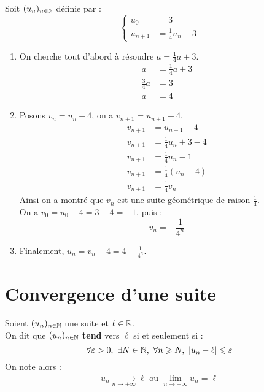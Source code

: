 \begin{example}
	Soit $(u_n)_{n \in \mathbb{N}}$ définie par :
	\[
	\begin{cases}
		u_0 &= 3 \\
		u_{n+1} &= \frac{1}{4} u_n + 3
	\end{cases}
	\]
	\begin{enumerate}
		\item On cherche tout d'abord à résoudre $a = \frac{1}{4} a + 3$.
		\begin{align*}
			a &= \frac{1}{4} a + 3 \\
			\frac{3}{4} a &= 3 \\
			a &= 4
		\end{align*}
		\item Posons $v_n = u_n - 4$, on a $v_{n+1} = u_{n+1} - 4$.
		\begin{align*}
			v_{n+1} &= u_{n+1} - 4 \\
			v_{n+1} &= \frac{1}{4} u_n + 3 - 4 \\
			v_{n+1} &= \frac{1}{4} u_n - 1 \\
			v_{n+1} &= \frac{1}{4} \left( u_n - 4 \right) \\
			v_{n+1} &= \frac{1}{4} v_n
		\end{align*}
		Ainsi on a montré que $v_n$ est une suite géométrique de raison $\frac{1}{4}$.
		\\
		On a $v_0 = u_0 - 4 = 3 - 4 = -1$, puis :
		\[ v_n = -\frac{1}{4^n} \]
		\item Finalement, $u_n = v_n + 4 = 4 - \frac{1}{4^n}$.
	\end{enumerate}
\end{example}

\section{Convergence d'une suite}
\begin{definition}
    Soient $(u_n)_{n \in \mathbb{N}}$ une suite et $\ell \in \mathbb{R}$. 
    \\
    On dit que $(u_n)_{n \in \mathbb{N}}$ \textbf{tend} vers $\ell$ si et seulement si :
    \[ \forall \varepsilon > 0,\ \exists N \in \mathbb{N},\ \forall n \geqslant N,\ \abs{u_n - \ell} \leqslant \varepsilon \]
    On note alors :
    \begin{align*}
        u_n \xrightarrow[n \to +\infty]{} \ell \text{ ou } \lim_{n \to +\infty} u_n = \ell
    \end{align*}
\end{definition}

